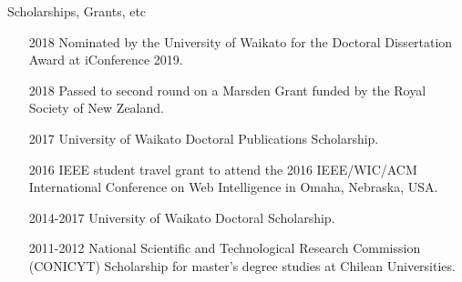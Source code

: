 \documentclass[handout]{beamer}
\begin{document}
\begin{frame}{Scholarships, Grants, etc}
\begin{scriptsize}
  \begin{enumerate}
 \item[2018] Nominated by the University of Waikato for the Doctoral Dissertation Award at iConference 2019.
 \item[2018] Passed to second round on a Marsden Grant funded by the Royal Society of New Zealand.
\item[2017] University of Waikato Doctoral Publications Scholarship.

\item[2016] IEEE student travel grant to attend the 2016
IEEE/WIC/ACM International Conference on Web Intelligence in Omaha, Nebraska, USA.

\item[2014-2017]  University of Waikato Doctoral Scholarship.

\item[2011-2012]  National Scientific and Technological Research Commission (CONICYT) Scholarship for master's degree studies at Chilean Universities.
  \end{enumerate} 
\end{scriptsize}

\end{frame}
\end{document}
